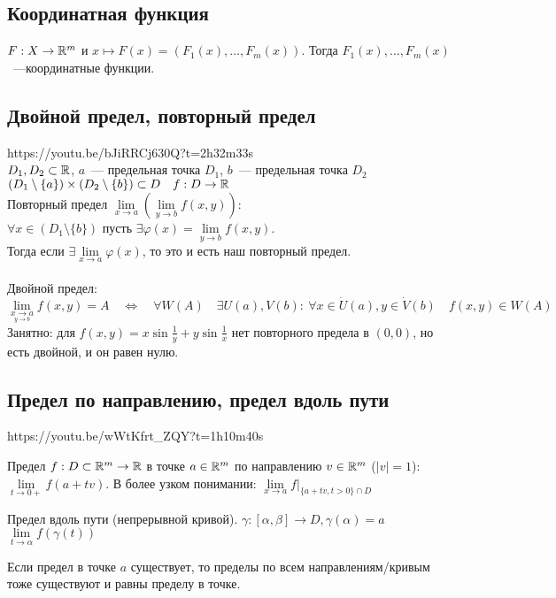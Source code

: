 \documentclass[../main.tex]{subfiles}
\begin{document}
\subsection{Координатная функция}
$F: X\to\mathbb{R}^m$ и $x \mapsto F(x)=(F_1(x), \dots, F_m(x))$.
Тогда $F_1(x), \dots, F_m(x)$~---координатные функции.

\subsection{Двойной предел, повторный предел}\label{subsec:1.44}
https://youtu.be/bJiRRCj630Q?t=2h32m33s\\
$D_1, D_2 \subset \mathbb{R}$, $a$~--- предельная точка $D_1$, $b$~--- предельная точка $D_2$\\
$(D_1 \setminus \{a\})\times(D_2 \setminus \{b\})\subset D \quad f:D\to\mathbb{R}$\\
Повторный предел $\lim\limits_{x \to a}\left(\lim\limits_{y \to b}f(x,y)\right)$:\\
$\forall x \in (D_1 \setminus \{b\})$ пусть $\exists \varphi(x)=\lim\limits_{y \to b} f(x,y)$.\\
Тогда если $\exists \lim\limits_{x \to a}\varphi(x)$, то это и есть наш повторный предел.\\\\
Двойной предел:
\begin{equation*}
    \lim_{\underset{y \to b}{x \to a}}f(x,y)=A \quad \Leftrightarrow \quad
    \forall W(A) \quad \exists U(a), V(b):\  \forall x\in\dot{U}(a), y\in\dot{V}(b) \quad f(x,y) \in W(A)
\end{equation*}
Занятно: для $f(x,y)=x\sin\frac{1}{y}+y\sin\frac{1}{x}$ нет повторного предела в $(0,0)$,
но есть двойной, и он равен нулю.

\subsection{Предел по направлению, предел вдоль пути}
https://youtu.be/wWtKfrt\_ZQY?t=1h10m40s

Предел $f:D\subset\mathbb{R}^m\to\mathbb{R}$ в точке $a\in\mathbb{R}^m$ по направлению $v\in\mathbb{R}^m$ ($|v|=1$): $\lim\limits_{t \to 0+}f(a+tv)$.
В более узком понимании: $\lim\limits_{x \to a}f|_{\{a+tv, t>0\} \cap D}$

Предел вдоль пути (непрерывной кривой).
$\gamma: [\alpha, \beta] \to D, \gamma(\alpha)=a$\qquad
$\lim\limits_{t \to \alpha}f(\gamma(t))$

Если предел в точке $a$ существует, то пределы по всем направлениям/кривым тоже существуют и равны пределу в точке.
\end{document}
